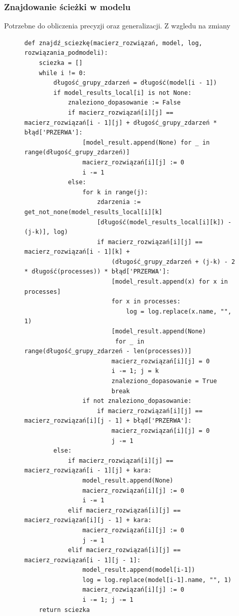 \subsubsection{Znajdowanie ścieżki w modelu}
Potrzebne do obliczenia precyzji oraz generalizacji. Z wzgledu na zmiany
\begin{figure}[!ht]
\lstset{caption=Znajdowanie ścieżki w modelu, captionpos=b}
\lstset{label=src:traceback, frame=single}
\begin{lstlisting}[escapeinside=``]
def znajdź_sciezkę(macierz_rozwiązań, model, log, rozwiązania_podmodeli):
    sciezka = []
    while i != 0:
        długość_grupy_zdarzeń = długość(model[i - 1])
        if model_results_local[i] is not None:
            znaleziono_dopasowanie := False
            if macierz_rozwiązań[i][j] == macierz_rozwiązań[i - 1][j] + długość_grupy_zdarzeń * błąd['PRZERWA']:
                [model_result.append(None) for _ in range(długość_grupy_zdarzeń)]
                macierz_rozwiązań[i][j] := 0
                i -= 1
            else:
                for k in range(j):
                    zdarzenia := get_not_none(model_results_local[i][k]
                    [długość(model_results_local[i][k]) - (j-k)], log)
                    if macierz_rozwiązań[i][j] == macierz_rozwiązań[i - 1][k] + 
                    	(długość_grupy_zdarzeń + (j-k) - 2 * długość(processes)) * błąd['PRZERWA']:
                        [model_result.append(x) for x in processes]
                        for x in processes:
                            log = log.replace(x.name, "", 1)
                        [model_result.append(None) 
                         for _ in range(długość_grupy_zdarzeń - len(processes))]
                        macierz_rozwiązań[i][j] = 0
                        i -= 1; j = k
                        znaleziono_dopasowanie = True
                        break
                if not znaleziono_dopasowanie:
                    if macierz_rozwiązań[i][j] == macierz_rozwiązań[i][j - 1] + błąd['PRZERWA']:
                        macierz_rozwiązań[i][j] = 0
                        j -= 1
        else:
            if macierz_rozwiązań[i][j] == macierz_rozwiązań[i - 1][j] + kara:
                model_result.append(None)
                macierz_rozwiązań[i][j] := 0
                i -= 1
            elif macierz_rozwiązań[i][j] == macierz_rozwiązań[i][j - 1] + kara:
                macierz_rozwiązań[i][j] := 0
                j -= 1
            elif macierz_rozwiązań[i][j] == macierz_rozwiązań[i - 1][j - 1]:
                model_result.append(model[i-1])
                log = log.replace(model[i-1].name, "", 1)
                macierz_rozwiązań[i][j] := 0
                i -= 1; j -= 1
    return sciezka
\end{lstlisting}
\end{figure}
\clearpage


